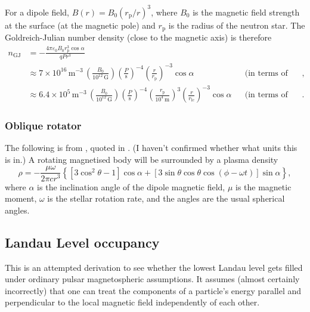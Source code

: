 \documentclass{book}
\newcommand{\rL}{r_\text{lc}} %
\newcommand{\rp}{r_\text{p}} %
\begin{document}
For a dipole field, $B(r) = B_0 (\rp/r)^3$, where $B_0$ is the magnetic field strength at the surface (at the magnetic pole) and $\rp$ is the radius of the neutron star.
The Goldreich-Julian number density (close to the magnetic axis) is therefore
\begin{equation}
    \begin{aligned}
    n_\text{GJ}
        &= -\frac{4\pi\varepsilon_0 B_0 \rp^3 \cos\alpha}{qPr^3} \\
        &\approx 7 \times 10^{16}\,\text{m}^{-3} \, \left(\frac{B_0}{10^{12}\,\text{G}}\right) \left(\frac{P}{\text{s}}\right)^{-4} \left(\frac{r}{\rp}\right)^{-3} \cos\alpha & & \text{(in terms of the stellar radius)}, \\
        &\approx 6.4 \times 10^5\,\text{m}^{-3} \, \left(\frac{B_0}{10^{12}\,\text{G}}\right) \left(\frac{P}{\text{s}}\right)^{-4} \left(\frac{\rp}{10^4\,\text{m}}\right)^3 \left(\frac{r}{\rL}\right)^{-3} \cos\alpha & & \text{(in terms of the light cylinder radius)}.
    \end{aligned}
\end{equation}


\subsubsection{Oblique rotator}

The following is from \citet{Hones1965}, quoted in \citet{Michel2004}.
(I haven't confirmed whether what units this is in.)
A rotating magnetised body will be surrounded by a plasma density
\begin{equation}
    \rho = -\frac{\mu\omega}{2\pi cr^3} \left\{ [ 3 \cos^2\theta - 1 ] \cos\alpha + \left[ 3 \sin\theta \cos\theta \cos(\phi - \omega t) \right] \sin\alpha \right \},
\end{equation}
where $\alpha$ is the inclination angle of the dipole magnetic field, $\mu$ is the magnetic moment, $\omega$ is the stellar rotation rate, and the angles are the usual spherical angles.

\subsection{Landau Level occupancy}

This is an attempted derivation to see whether the lowest Landau level gets filled under ordinary pulsar magnetospheric assumptions.
It assumes (almost certainly incorrectly) that one can treat the components of a particle's energy parallel and perpendicular to the local magnetic field independently of each other.
\end{document}
